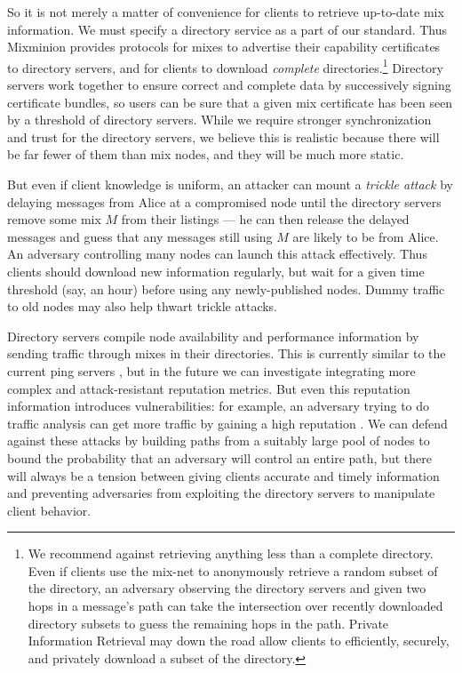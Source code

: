 \documentclass[times,10pt,twocolumn]{article}
\begin{document}
So it is not merely a matter of convenience for clients to retrieve
up-to-date mix information.
We must specify a directory
service as a part of our standard. Thus Mixminion provides protocols for
mixes to advertise their capability certificates to directory servers,
and for clients to download \emph{complete} directories.\footnote{
  We recommend against retrieving anything less than a complete directory.
  Even if clients use the mix-net to anonymously retrieve a random
  subset of the directory, an adversary observing the directory servers
  and given two hops in a message's path can take the intersection over
  recently downloaded directory subsets to guess the remaining hops in
  the path. Private Information Retrieval \cite{malkin-thesis} may down
  the road allow clients to efficiently, securely, and privately download
  a subset of the directory.
}
Directory servers work together to ensure correct and complete data by
successively signing certificate bundles, so users can be sure that a
given mix certificate has been seen by a threshold of directory servers.
While we require stronger synchronization and trust for the directory
servers, we believe this is realistic because there will be far fewer
of them than mix nodes, and they will be much more static.

But even if client knowledge is uniform, an attacker can mount a
\emph{trickle attack} by delaying messages from Alice at a compromised
node until the directory servers remove some mix $M$ from their listings
--- he can then release the delayed messages and guess that any messages
still using $M$ are likely to be from Alice. An adversary controlling
many nodes can launch this attack effectively. Thus clients
should download new information regularly,
but wait for a given time threshold (say, an hour) before using any
newly-published nodes. Dummy traffic to old nodes may also 
help thwart trickle attacks.

Directory servers compile node availability and performance information by
sending traffic through mixes in their directories. This is currently
similar to the current ping servers \cite{echolot}, but in the
future we can investigate integrating more complex and attack-resistant
reputation metrics.  But even this reputation information introduces
vulnerabilities: for example, an adversary 
trying to do traffic analysis
can get more traffic by gaining a high reputation \cite{mix-acc}. We can
defend against these attacks by building paths from a suitably large pool
of nodes \cite{casc-rep} to bound the probability that an adversary will
control an entire path, but there will always be a tension between giving
clients accurate and timely information and preventing adversaries from
exploiting the directory servers to manipulate client behavior.
\end{document}
